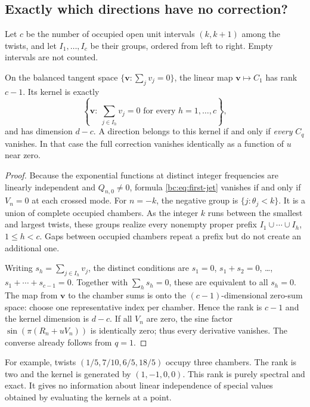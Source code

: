\subsection{Exactly which directions have no correction?}

Let $c$ be the number of occupied open unit intervals $(k,k+1)$ among the
twists, and let $I_1,\ldots,I_c$ be their groups, ordered from left to
right. Empty intervals are not counted.

\begin{theorem}\label{bc:thm:rank}
On the balanced tangent space $\{\bm v:\sum_jv_j=0\}$, the linear map
$\bm v\mapsto C_1$ has rank $c-1$. Its kernel is exactly
\begin{equation}\label{bc:eq:chamber-kernel}
 \left\{\bm v:\ \sum_{j\in I_h}v_j=0\text{ for every }h=1,\ldots,c\right\},
\end{equation}
and has dimension $d-c$. A direction belongs to this kernel if and only
if \emph{every} $C_q$ vanishes. In that case the full correction vanishes
identically as a function of $u$ near zero.
\end{theorem}
\begin{proof}
Because the exponential functions at distinct integer frequencies are
linearly independent and $Q_{n,0}\ne0$, formula
\eqref{bc:eq:first-jet} vanishes if and only if $V_n=0$ at each crossed
mode. For $n=-k$, the negative group is $\{j:\theta_j<k\}$. It is a union
of complete occupied chambers. As the integer $k$ runs between the
smallest and largest twists, these groups realize every nonempty proper
prefix $I_1\cup\cdots\cup I_h$, $1\le h<c$. Gaps between occupied
chambers repeat a prefix but do not create an additional one.

Writing $s_h=\sum_{j\in I_h}v_j$, the distinct conditions are
$s_1=0$, $s_1+s_2=0$, \ldots, $s_1+\cdots+s_{c-1}=0$. Together with
$\sum_hs_h=0$, these are equivalent to all $s_h=0$. The map from $\bm v$
to the chamber sums is onto the $(c-1)$-dimensional zero-sum space:
choose one representative index per chamber. Hence the rank is $c-1$
and the kernel dimension is $d-c$. If all $V_n$ are zero, the sine
factor $\sin(\pi(R_n+uV_n))$ is identically zero; thus every derivative
vanishes. The converse already follows from $q=1$.
\end{proof}

For example, twists $(1/5,7/10,6/5,18/5)$ occupy three chambers. The rank
is two and the kernel is generated by $(1,-1,0,0)$. This rank is purely
spectral and exact. It gives no information about linear independence of
special values obtained by evaluating the kernels at a point.

